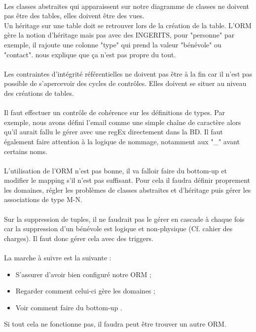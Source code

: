\documentclass [a4paper] {article}
\begin{document}
\paragraph*{}
Les classes abstraites qui apparaissent sur notre diagramme de classes ne doivent pas être des tables, elles doivent être des vues. \\
Un héritage sur une table doit se retrouver lors de la création de la table. L'ORM gère la notion d'héritage mais pas avec des INGERITS, pour "personne" par exemple, il rajoute une colonne "type" qui prend la valeur "bénévole" ou "contact". \nomTuteurPedago{} nous explique que ça n'est pas propre du tout.
\paragraph*{}
Les contraintes d'intégrité référentielles ne doivent pas être à la fin car il n'est pas possible de s’apercevoir des cycles de contrôles. Elles doivent se situer au niveau des créations de tables.
\paragraph*{}
Il faut effectuer un contrôle de cohérence sur les définitions de types. Par exemple, nous avons défini l'email comme une simple chaîne de caractère alors qu'il aurait fallu le gérer avec une regEx directement dans la BD. Il faut également faire attention à la logique de nommage, notamment aux "\_" avant certains noms.
\paragraph*{}
L'utilisation de l'ORM n'est pas bonne, il va falloir faire du bottom-up et modifier le mapping s'il n'est pas suffisant. Pour cela il faudra définir proprement les domaines, régler les problèmes de classes abstraites et d'héritage puis gérer les associations de type M-N.
\paragraph*{}
Sur la suppression de tuples, il ne faudrait pas le gérer en cascade à chaque fois car la suppression d'un bénévole est logique et non-physique (Cf. cahier des charges). Il faut donc gérer cela avec des triggers.
\paragraph*{}
La marche à suivre est la suivante :
\begin{itemize}
\item S'assurer d'avoir bien configuré notre ORM ;
\item Regarder comment celui-ci gère les domaines ;
\item Voir comment faire du bottom-up .
\end{itemize}
Si tout cela ne fonctionne pas, il faudra peut être trouver un autre ORM.






\newpage
\end{document}
